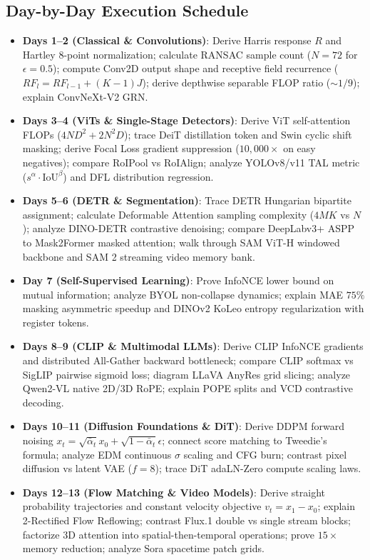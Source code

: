 \subsection*{Day-by-Day Execution Schedule}
\begin{itemize}[leftmargin=*,itemsep=0.8pt]
\item \textbf{Days 1--2 (Classical \& Convolutions)}: Derive Harris response $R$ and Hartley 8-point normalization; calculate RANSAC sample count ($N=72$ for $\epsilon=0.5$); compute Conv2D output shape and receptive field recurrence ($RF_l = RF_{l-1} + (K-1)J$); derive depthwise separable FLOP ratio ($\sim 1/9$); explain ConvNeXt-V2 GRN.
\item \textbf{Days 3--4 (ViTs \& Single-Stage Detectors)}: Derive ViT self-attention FLOPs ($4ND^2 + 2N^2D$); trace DeiT distillation token and Swin cyclic shift masking; derive Focal Loss gradient suppression ($10,000\times$ on easy negatives); compare RoIPool vs RoIAlign; analyze YOLOv8/v11 TAL metric ($s^\alpha \cdot \text{IoU}^\beta$) and DFL distribution regression.
\item \textbf{Days 5--6 (DETR \& Segmentation)}: Trace DETR Hungarian bipartite assignment; calculate Deformable Attention sampling complexity ($4MK$ vs $N$); analyze DINO-DETR contrastive denoising; compare DeepLabv3+ ASPP to Mask2Former masked attention; walk through SAM ViT-H windowed backbone and SAM 2 streaming video memory bank.
\item \textbf{Day 7 (Self-Supervised Learning)}: Prove InfoNCE lower bound on mutual information; analyze BYOL non-collapse dynamics; explain MAE $75\%$ masking asymmetric speedup and DINOv2 KoLeo entropy regularization with register tokens.
\item \textbf{Days 8--9 (CLIP \& Multimodal LLMs)}: Derive CLIP InfoNCE gradients and distributed All-Gather backward bottleneck; compare CLIP softmax vs SigLIP pairwise sigmoid loss; diagram LLaVA AnyRes grid slicing; analyze Qwen2-VL native 2D/3D RoPE; explain POPE splits and VCD contrastive decoding.
\item \textbf{Days 10--11 (Diffusion Foundations \& DiT)}: Derive DDPM forward noising $x_t = \sqrt{\bar{\alpha}_t} x_0 + \sqrt{1-\bar{\alpha}_t}\epsilon$; connect score matching to Tweedie's formula; analyze EDM continuous $\sigma$ scaling and CFG burn; contrast pixel diffusion vs latent VAE ($f=8$); trace DiT adaLN-Zero compute scaling laws.
\item \textbf{Days 12--13 (Flow Matching \& Video Models)}: Derive straight probability trajectories and constant velocity objective $v_t = x_1 - x_0$; explain 2-Rectified Flow Reflowing; contrast Flux.1 double vs single stream blocks; factorize 3D attention into spatial-then-temporal operations; prove $15\times$ memory reduction; analyze Sora spacetime patch grids.

\end{itemize}

